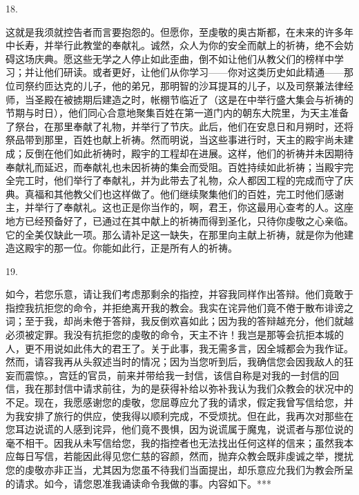 18. \par

这就是我须就控告者而言要抱怨的。但愿你，至虔敬的奥古斯都，在未来的许多年中长寿，并举行此教堂的奉献礼。诚然，众人为你的安全而献上的祈祷，绝不会妨碍这场庆典。愿这些无学之人停止如此歪曲，倒不如让他们从教父们的榜样中学习；并让他们研读。或者更好，让他们从你学习——你对这类历史如此精通——那位司祭约匝达克的儿子，他的弟兄，那明智的沙耳提耳的儿子，以及司祭兼法律经师，当圣殿在被掳期后建造之时，帐棚节临近了（这是在中举行盛大集会与祈祷的节期与时日），他们同心合意地聚集百姓在第一道门内的朝东大院里，为天主准备了祭台，在那里奉献了礼物，并举行了节庆。此后，他们在安息日和月朔时，还将祭品带到那里，百姓也献上祈祷。然而明说，当这些事进行时，天主的殿宇尚未建成；反倒在他们如此祈祷时，殿宇的工程却在进展。这样，他们的祈祷并未因期待奉献礼而延迟，而奉献礼也未因祈祷的集会而受阻。百姓持续如此祈祷；当殿宇完全完工时，他们举行了奉献礼，并为此带去了礼物，众人都因工程的完成而守了庆典。真福和其他教父们也这样做了。他们继续聚集他们的百姓，完工时他们感谢主，并举行了奉献礼。这也正是你当作的，啊，君王，你这最用心查考的人。这座地方已经预备好了，已通过在其中献上的祈祷而得到圣化，只待你虔敬之心亲临。它的全美仅缺此一项。那么请补足这一缺失，在那里向主献上祈祷，就是你为他建造这殿宇的那一位。你能如此行，正是所有人的祈祷。\par

19. \par

如今，若您乐意，请让我们考虑那剩余的指控，并容我同样作出答辩。他们竟敢于指控我抗拒您的命令，并拒绝离开我的教会。我实在诧异他们竟不倦于散布诽谤之词；至于我，却尚未倦于答辩，我反倒欢喜如此；因为我的答辩越充分，他们就越必须被定罪。我没有抗拒您的虔敬的命令，天主不许！我岂是那等会抗拒本城的人，更不用说如此伟大的君王了。关于此事，我无需多言，因全城都会为我作证。然而，请容我再从头叙述当时的情况；因为当您听到后，我确信您会因我敌人的狂妄而震惊。，宫廷的官员，前来并带给我一封信，该信自称是对我的一封信的回信，我在那封信中请求前往，为的是获得补给以弥补我认为我们众教会的状况中的不足。现在，我愿感谢您的虔敬，您屈尊应允了我的请求，假定我曾写信给您，并为我安排了旅行的供应，使我得以顺利完成，不受烦扰。但在此，我再次对那些在您耳边说谎的人感到诧异，他们竟不畏惧，因为说谎属于魔鬼，说谎者与那位说的毫不相干。因我从未写信给您，我的指控者也无法找出任何这样的信来；虽然我本应每日写信，若能因此得见您仁慈的容颜，然而，抛弃众教会既非虔诚之举，搅扰您的虔敬亦非正当，尤其因为您虽不待我们当面提出，却乐意应允我们为教会所呈的请求。如今，请您恩准我诵读命令我做的事。内容如下。***\par

